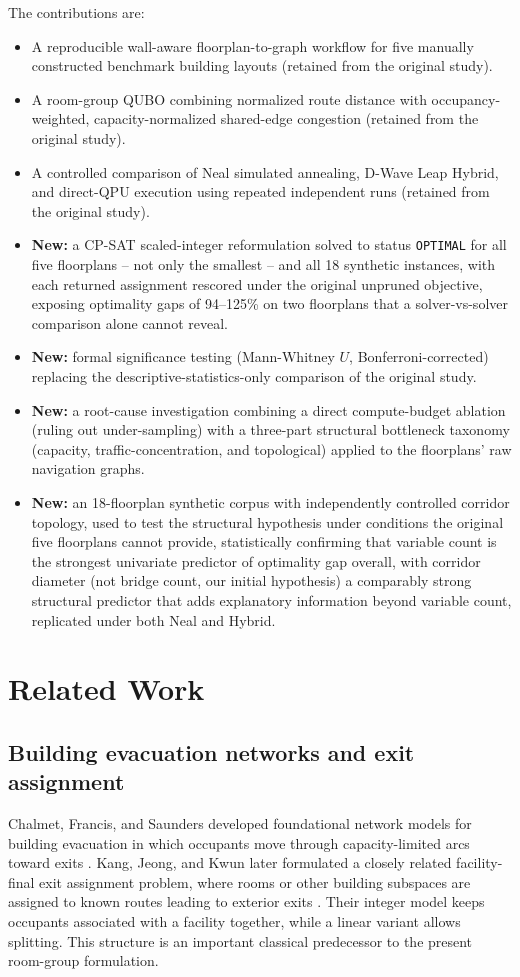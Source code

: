 \documentclass[11pt]{article}
\begin{document}
The contributions are:
\begin{itemize}[leftmargin=*]
\item A reproducible wall-aware floorplan-to-graph workflow for five manually constructed benchmark building layouts (retained from the original study).
\item A room-group QUBO combining normalized route distance with occupancy-weighted, capacity-normalized shared-edge congestion (retained from the original study).
\item A controlled comparison of Neal simulated annealing, D-Wave Leap Hybrid, and direct-QPU execution using repeated independent runs (retained from the original study).
\item \textbf{New:} a CP-SAT scaled-integer reformulation solved to status \texttt{OPTIMAL} for all five floorplans -- not only the smallest -- and all 18 synthetic instances, with each returned assignment rescored under the original unpruned objective, exposing optimality gaps of 94--125\% on two floorplans that a solver-vs-solver comparison alone cannot reveal.
\item \textbf{New:} formal significance testing (Mann-Whitney $U$, Bonferroni-corrected) replacing the descriptive-statistics-only comparison of the original study.
\item \textbf{New:} a root-cause investigation combining a direct compute-budget ablation (ruling out under-sampling) with a three-part structural bottleneck taxonomy (capacity, traffic-concentration, and topological) applied to the floorplans' raw navigation graphs.
\item \textbf{New:} an 18-floorplan synthetic corpus with independently controlled corridor topology, used to test the structural hypothesis under conditions the original five floorplans cannot provide, statistically confirming that variable count is the strongest univariate predictor of optimality gap overall, with corridor diameter (not bridge count, our initial hypothesis) a comparably strong structural predictor that adds explanatory information beyond variable count, replicated under both Neal and Hybrid.
\end{itemize}

\section{Related Work}

\subsection{Building evacuation networks and exit assignment}
Chalmet, Francis, and Saunders developed foundational network models for building evacuation in which occupants move through capacity-limited arcs toward exits \cite{chalmet}. Kang, Jeong, and Kwun later formulated a closely related facility-final exit assignment problem, where rooms or other building subspaces are assigned to known routes leading to exterior exits \cite{kang}. Their integer model keeps occupants associated with a facility together, while a linear variant allows splitting. This structure is an important classical predecessor to the present room-group formulation.
\end{document}
